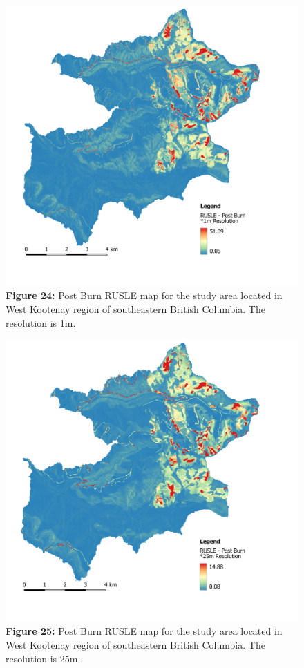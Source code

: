 \documentclass[
]{article}
\begin{document}
\begin{figure}
\centering
\includegraphics{img/rusle_1m_postfire.png}
\caption{\textbf{Figure 24:} Post Burn RUSLE map for the study area located in West Kootenay region of southeastern British Columbia. The resolution is 1m.}
\end{figure}

\begin{figure}
\centering
\includegraphics{img/rusle_25m_postfire.png}
\caption{\textbf{Figure 25:} Post Burn RUSLE map for the study area located in West Kootenay region of southeastern British Columbia. The resolution is 25m.}
\end{figure}
\end{document}
